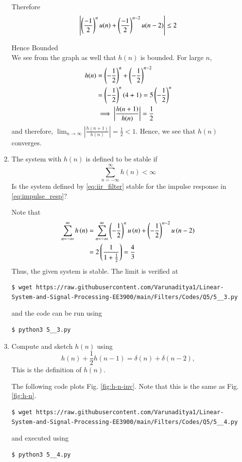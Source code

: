\documentclass[journal,12pt,twocolumn]{IEEEtran}
\renewcommand\thesection{\arabic{section}}
\begin{document}
\begin{enumerate}[label=\thesection.\arabic*]
Therefore
\begin{equation}
    \left\vert\left( \frac{-1}{2}\right)^n u(n) + \left( \frac{-1}{2}\right)^{n-2} u(n-2)\right\vert \leq 2
\end{equation}

Hence Bounded
\\
We see from the graph as well that $h(n)$ is bounded. For large $n$,
\begin{align}
	h(n) &= \left(-\frac{1}{2}\right)^n + \left(-\frac{1}{2}\right)^{n - 2} \\
		 &= \left(-\frac{1}{2}\right)^{n}\left(4 + 1\right) = 5\left(-\frac{1}{2}\right)^n \\
		 &\implies \left|\frac{h(n + 1)}{h(n)}\right| = \frac{1}{2}
\end{align}
and therefore, $\lim_{n \to \infty}\left|\frac{h(n + 1)}{h(n)}\right| = \frac{1}{2} < 1$. Hence, we see that $h(n)$ converges.  
\item The system with $h(n)$ is defined to be stable if
\begin{equation}
\sum_{n=-\infty}^{\infty}h(n) < \infty
\end{equation}
Is the system defined by \eqref{eq:iir_filter} stable for the impulse response in \eqref{eq:impulse_resp}?

\solution
Note that
\begin{align}
	\sum_{n = -\infty}^{\infty}h\left(n\right) &= \sum_{n = -\infty}^{\infty}
	\left(-\frac{1}{2}\right)^nu\left(n\right) + \left(-\frac{1}{2}\right)^{n - 2}u\left(n - 2\right) \\
										 &= 2\left(\frac{1}{1 + \frac{1}{2}}\right) = \frac{4}{3}
\end{align}
Thus, the given system is stable. The limit is verified at
\begin{lstlisting}
$ wget https://raw.githubusercontent.com/Varunaditya1/Linear-System-and-Signal-Processing-EE3900/main/Filters/Codes/Q5/5__3.py
\end{lstlisting}
and the code can be run using
\begin{lstlisting}
$ python3 5__3.py
\end{lstlisting}

\item 
Compute and sketch $h(n)$ using 
\begin{equation}
\label{eq:iir_filter_h}
h(n) + \frac{1}{2}h(n-1) = \delta(n) + \delta(n-2), 
\end{equation}
This is the definition of $h(n)$.

\solution The following code plots Fig. \eqref{fig:h-n-inv}. Note that this is
the same as Fig. \eqref{fig:h-n}.
\begin{lstlisting}
$ wget https://raw.githubusercontent.com/Varunaditya1/Linear-System-and-Signal-Processing-EE3900/main/Filters/Codes/Q5/5__4.py
\end{lstlisting}
and executed using
\begin{lstlisting}
$ python3 5__4.py
\end{lstlisting}


\end{enumerate}
\end{document}
